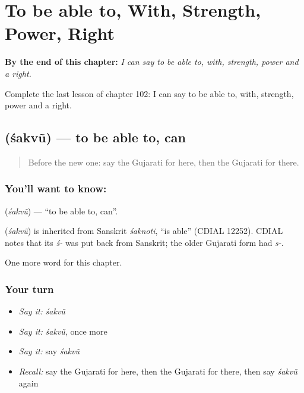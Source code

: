 
\chapter{To be able to, With, Strength, Power, Right}
\label{ch:gu-to-be-able-to-with-strength-power-right}

\begin{chapteropening}
\textbf{By the end of this chapter:} \emph{I can say to be able to, with, strength, power and a right.}

Complete the last lesson of chapter 102: I can say to be able to, with, strength, power and a right.
\end{chapteropening}

\section[\texorpdfstring{\gu{શકવું} (śakvũ)}{શકવું (śakvũ)}]{ (śakvũ) — to be able to, can}

\label{lesson:GU-C102-sakvu}



\begin{quote}
Before the new one: say the Gujarati for here, then the Gujarati for there.
\end{quote}

\subsection*{You'll want to know: }
\textbf{} (\emph{śakvũ}) — \textquotedblleft{}to be able to, can\textquotedblright{}.

\begin{cousinweb}
\textbf{} (\emph{śakvũ}) is inherited from Sanskrit \emph{śaknoti}, \textquotedblleft{}is able\textquotedblright{} (CDIAL 12252). CDIAL notes that its \emph{ś-} was put back from Sanskrit; the older Gujarati form had \emph{s-}.
\end{cousinweb}

\begin{grammarlens}[title={What you've built}]
One more word for this chapter.
\end{grammarlens}

\subsection*{Your turn}
\begin{itemize}
\raggedright
  \item \emph{Say it:} \emph{śakvũ}
  \item \emph{Say it:} \emph{śakvũ}, once more
  \item \emph{Say it:} say \emph{śakvũ}
  \item \emph{Recall:} say the Gujarati for here, then the Gujarati for there, then say \emph{śakvũ} again
\end{itemize}

